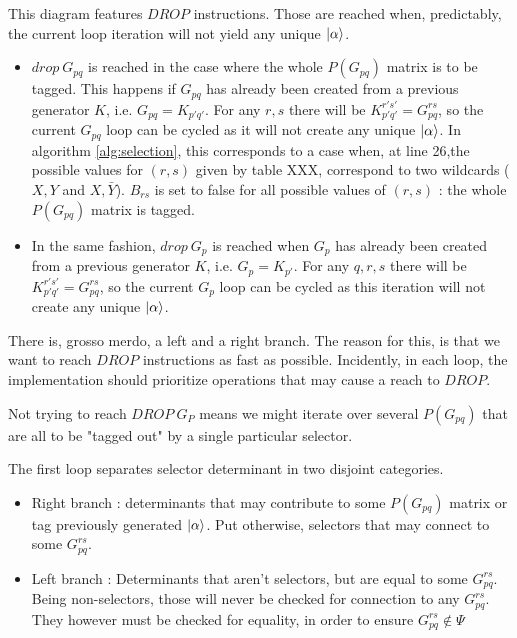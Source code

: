 \documentclass[./thesis.tex]{subfiles}
\begin{document}
This diagram features $DROP$ instructions. Those are reached when, predictably, the current loop iteration will not yield any unique $\ket \alpha$. 

\begin{itemize}
\item
$drop\ G_{pq}$ is reached in the case where the whole $P(G_{pq})$ matrix is to be tagged. This happens if $G_{pq}$ has already been created from a previous generator $K$, i.e. $G_{pq} = K_{p'q'}$. For any $r,s$ there will be $K_{p'q'}^{r's'} = G_{pq}^{rs}$, so the current $G_{pq}$ loop can be cycled as it will not create any unique $\ket \alpha$.
In algorithm \ref{alg:selection}, this corresponds to a case when, at line 26,the possible values for $(r,s)$ given by table XXX, correspond to two wildcards ($X,Y$ and $X,\bar Y$). $B_{rs}$ is set to false for all possible values of $(r,s)$ : the whole $P(G_{pq})$ matrix is tagged.
\item
In the same fashion, $drop\ G_{p}$ is reached when $G_{p}$ has already been created from a previous generator $K$, i.e. $G_{p} = K_{p'}$. For any $q,r,s$ there will be $K_{p'q'}^{r's'} = G_{pq}^{rs}$, so the current $G_{p}$ loop can be cycled as this iteration will not create any unique $\ket \alpha$.\\
\end{itemize}


There is, grosso merdo, a left and a right branch. The reason for this, is that we want to reach $DROP$ instructions as fast as possible. Incidently, in each loop, the implementation should prioritize operations that may cause a reach to $DROP$.

Not trying to reach $DROP\ G_{P}$ means we might iterate over several $P(G_{pq})$ that are all to be "tagged out" by a single particular selector.

The first loop separates selector determinant in two disjoint categories.

\begin{itemize}
\item
Right branch : determinants that may contribute to some $P(G_{pq})$ matrix or tag previously generated $\ket \alpha$. Put otherwise, selectors that may connect to some $G_{pq}^{rs}$.

\item
Left branch : Determinants that aren't selectors, but are equal to some $G_{pq}^{rs}$. Being non-selectors, those will never be checked for connection to any $G_{pq}^{rs}$. They however must be checked for equality, in order to ensure $G_{pq}^{rs} \notin \Psi$
\end{itemize}
\end{document}
